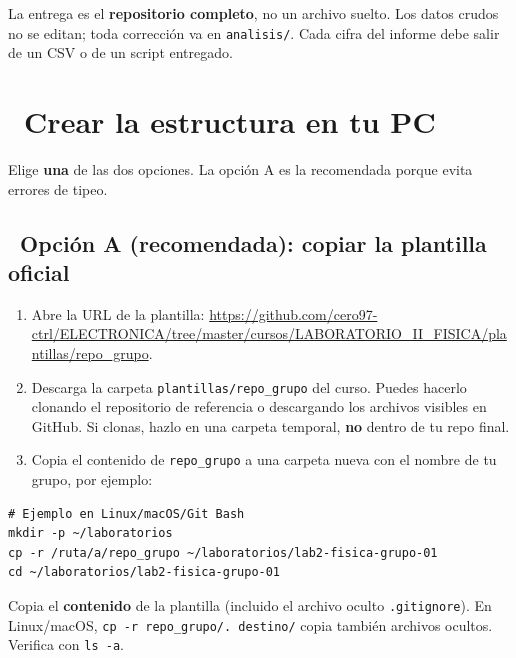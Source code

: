 \documentclass[11pt,a4paper]{article}
\newcommand{\iconotexto}[2]{\textcolor{cyanNeon}{\faIcon{#1}}~#2}
\begin{document}
\begin{tcolorbox}[cajaRecomendacion,title={\faIcon{info-circle}~Regla de oro}]
La entrega es el \textbf{repositorio completo}, no un archivo suelto. Los datos crudos no se editan; toda corrección va en \texttt{analisis/}. Cada cifra del informe debe salir de un CSV o de un script entregado.
\end{tcolorbox}

\section{\iconotexto{laptop-code}{Crear la estructura en tu PC}}

Elige \textbf{una} de las dos opciones. La opción A es la recomendada porque evita errores de tipeo.

\subsection{\iconotexto{copy}{Opción A (recomendada): copiar la plantilla oficial}}

\begin{enumerate}[leftmargin=1.6em,itemsep=4pt,topsep=2pt]
  \item Abre la URL de la plantilla: \url{https://github.com/cero97-ctrl/ELECTRONICA/tree/master/cursos/LABORATORIO_II_FISICA/plantillas/repo_grupo}.
  \item Descarga la carpeta \texttt{plantillas/repo\_grupo} del curso. Puedes hacerlo clonando el repositorio de referencia o descargando los archivos visibles en GitHub. Si clonas, hazlo en una carpeta temporal, \textbf{no} dentro de tu repo final.
  \item Copia el contenido de \texttt{repo\_grupo} a una carpeta nueva con el nombre de tu grupo, por ejemplo:
\end{enumerate}

\begin{lstlisting}
# Ejemplo en Linux/macOS/Git Bash
mkdir -p ~/laboratorios
cp -r /ruta/a/repo_grupo ~/laboratorios/lab2-fisica-grupo-01
cd ~/laboratorios/lab2-fisica-grupo-01
\end{lstlisting}

\begin{cajaRecuerda}
Copia el \textbf{contenido} de la plantilla (incluido el archivo oculto \texttt{.gitignore}). En Linux/macOS, \texttt{cp -r repo\_grupo/. destino/} copia también archivos ocultos. Verifica con \texttt{ls -a}.
\end{cajaRecuerda}
\end{document}
